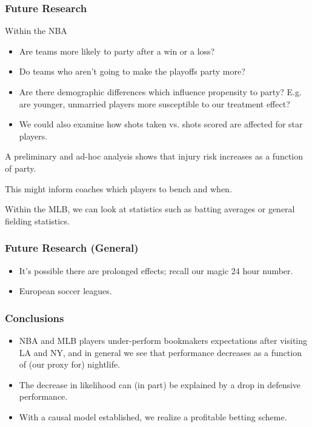 \documentclass{beamer}
\begin{document}
\begin{frame}   \frametitle{Future Research}
  Within the NBA
  \begin{itemize}     \item Are teams more likely to party after a win or a loss?
    \item Do teams who aren't going to make the playoffs party more?
    \item Are there demographic differences which influence propensity to party? E.g. are younger, unmarried players more susceptible to our treatment effect?
    \item We could also examine how shots taken vs. shots scored are affected for star players.
  \end{itemize}
  A preliminary and ad-hoc analysis shows that injury risk increases as a function of party.

  This might inform coaches which players to bench and when.

  Within the MLB, we can look at statistics such as batting averages or general fielding statistics. \end{frame}

\begin{frame}   \frametitle{Future Research (General)}
  \begin{itemize}     \item It's possible there are prolonged effects; recall our magic 24 hour number.
    \item European soccer leagues.   \end{itemize} \end{frame}

\begin{frame}   \frametitle{Conclusions}
  \begin{itemize}     \item NBA and MLB players under-perform bookmakers expectations after visiting LA and NY, and in general we see that performance decreases as a function of (our proxy for) nightlife.
    \item The decrease in likelihood can (in part) be explained by a drop in defensive performance.
    \item With a causal model established, we realize a profitable betting scheme.   \end{itemize} \end{frame}
\end{document}
